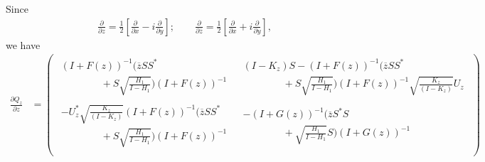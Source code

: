 \documentclass{amsart}
\begin{document}
Since
\begin{align*}
\frac{\partial}{\partial z} = \frac{1}{2}[\frac{\partial}{\partial x} -i\frac{\partial}{\partial y}]; \qquad
\frac{\partial}{\partial \overline{z}} = \frac{1}{2}[\frac{\partial}{\partial x} + i\frac{\partial}{\partial y}],
\end{align*}
we have
\begin{align*}
\frac{\partial Q_{z}}{\partial z} &=
\left(
                                      \begin{array}{cc}
                                         \begin{array}{c}
                                           (I + F(z))^{-1}(\overline{z}SS^{*}  \\
                                           \qquad \qquad + S\sqrt{\frac{H_1}{I - H_1}})(I + F(z))^{-1}
                                         \end{array}
                                         & \begin{array}{c}
                                             (I - K_z)S-(I + F(z))^{-1}(\overline{z}SS^{*}   \\
                                             \qquad \qquad + S\sqrt{\frac{H_1}{I - H_1}})(I + F(z))^{-1}\sqrt{\frac{K_{z}}{(I-K_{z})}}U_{z}
                                           \end{array}
                                          \\
                                        \begin{array}{c}
                                        -U_{z}^{*}\sqrt{\frac{K_{z}}{(I-K_{z})}}(I + F(z))^{-1}(\overline{z}SS^{*}  \\
                                         \qquad \qquad  + S\sqrt{\frac{H_1}{I - H_1}})(I + F(z))^{-1}
                                        \end{array}
                                        & \begin{array}{c}
                                          - (I + G(z))^{-1}(\overline{z}S^{*}S  \\
                                             \qquad \qquad + \sqrt{\frac{H_1}{I - H_1}}S )(I + G(z))^{-1}
                                          \end{array}
                                         \\
                                      \end{array}
                                    \right)\\

\end{align*}
\end{document}
